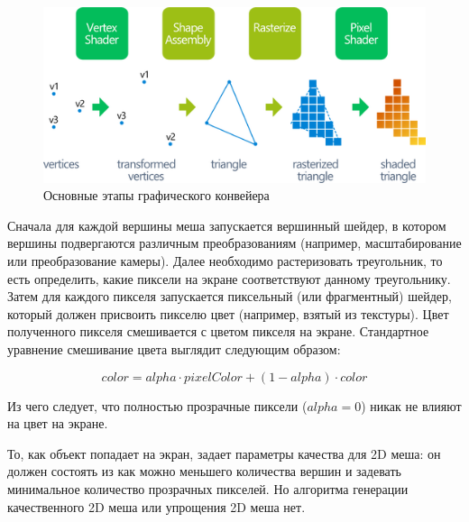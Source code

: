 \documentclass{fefu_thesis/cls/fefu}
\begin{document}
    \begin{figure}[H]
        \centering
        \includegraphics[scale=0.8]{images/graphicspipeline.png}
        \caption{Основные этапы графического конвейера}
        \label{GraphicsPipeline}
    \end{figure}

    Сначала для каждой вершины меша запускается вершинный шейдер, в котором вершины подвергаются различным преобразованиям (например, масштабирование или преобразование камеры). Далее необходимо растеризовать треугольник, то есть определить, какие пиксели на экране соответствуют данному треугольнику. Затем для каждого пикселя запускается пиксельный (или фрагментный) шейдер, который должен присвоить пикселю цвет (например, взятый из текстуры). Цвет полученного пикселя смешивается с цветом пикселя на экране. Стандартное уравнение смешивание цвета выглядит следующим образом:

    \[
        color = alpha \cdot pixelColor + (1 - alpha) \cdot color
    \]

    Из чего следует, что полностью прозрачные пиксели ($alpha = 0$) никак не влияют на цвет на экране.

    То, как объект попадает на экран, задает параметры качества для 2D меша: он должен состоять из как можно меньшего количества вершин и задевать минимальное количество прозрачных пикселей. Но алгоритма генерации качественного 2D меша или упрощения 2D меша нет.
\end{document}
